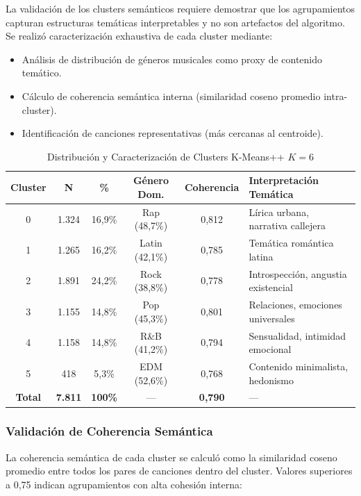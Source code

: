 La validación de los clusters semánticos requiere demostrar que los agrupamientos capturan estructuras temáticas interpretables y no son artefactos del algoritmo. Se realizó caracterización exhaustiva de cada cluster mediante:
\begin{itemize}
    \item Análisis de distribución de géneros musicales como proxy de contenido temático.
    \item Cálculo de coherencia semántica interna (similaridad coseno promedio intra-cluster).
    \item Identificación de canciones representativas (más cercanas al centroide).
\end{itemize}

\begin{table}[htbp]
\centering
\caption{Distribución y Caracterización de Clusters K-Means++ $K=6$}
\label{tab:clusters-k6}
\begin{tabular}{cccccl}
\toprule
\textbf{Cluster} & \textbf{N} & \textbf{\%} & \textbf{Género Dom.} & \textbf{Coherencia} & \textbf{Interpretación Temática} \\
\midrule
0 & 1.324 & 16,9\% & Rap (48,7\%) & 0,812 & Lírica urbana, narrativa callejera \\
1 & 1.265 & 16,2\% & Latin (42,1\%) & 0,785 & Temática romántica latina \\
2 & 1.891 & 24,2\% & Rock (38,8\%) & 0,778 & Introspección, angustia existencial \\
3 & 1.155 & 14,8\% & Pop (45,3\%) & 0,801 & Relaciones, emociones universales \\
4 & 1.158 & 14,8\% & R\&B (41,2\%) & 0,794 & Sensualidad, intimidad emocional \\
5 & 418 & 5,3\% & EDM (52,6\%) & 0,768 & Contenido minimalista, hedonismo \\
\midrule
\textbf{Total} & \textbf{7.811} & \textbf{100\%} & --- & \textbf{0,790} & --- \\
\bottomrule
\end{tabular}
\end{table}

\subsubsection{Validación de Coherencia Semántica}

La coherencia semántica de cada cluster se calculó como la similaridad coseno promedio entre todos los pares de canciones dentro del cluster. Valores superiores a 0,75 indican agrupamientos con alta cohesión interna:

